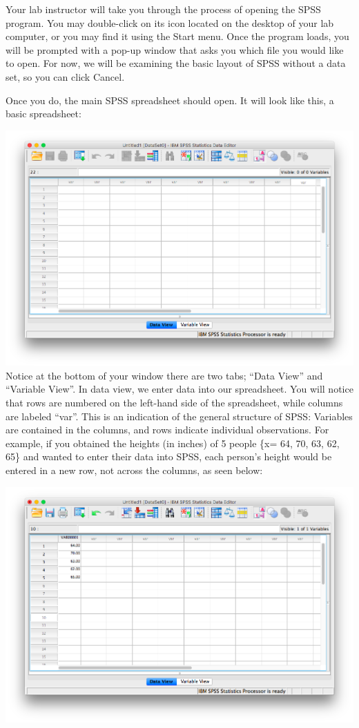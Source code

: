 \documentclass[
]{book}
\begin{document}
Your lab instructor will take you through the process of opening the SPSS program. You may double-click on its icon located on the desktop of your lab computer, or you may find it using the Start menu. Once the program loads, you will be prompted with a pop-up window that asks you which file you would like to open. For now, we will be examining the basic layout of SPSS without a data set, so you can click {Cancel}.

Once you do, the main SPSS spreadsheet should open. It will look like this, a basic spreadsheet:

\includegraphics{img/1.4.11.png}
Notice at the bottom of your window there are two tabs; ``Data View'' and ``Variable View''. In data view, we enter data into our spreadsheet. You will notice that rows are numbered on the left-hand side of the spreadsheet, while columns are labeled ``var''. This is an indication of the general structure of SPSS: Variables are contained in the columns, and rows indicate individual observations. For example, if you obtained the heights (in inches) of 5 people \{x= 64, 70, 63, 62, 65\} and wanted to enter their data into SPSS, each person's height would be entered in a new row, not across the columns, as seen below:

\includegraphics{img/1.4.12.png}
\end{document}
